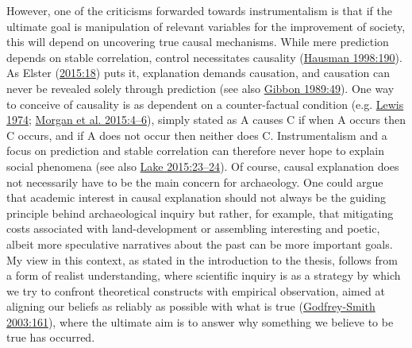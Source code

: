 \documentclass[
  a4paper,
  oneside]{uiophdthesis}
\begin{document}
However, one of the criticisms forwarded towards instrumentalism is that if the ultimate goal is manipulation of relevant variables for the improvement of society, this will depend on uncovering true causal mechanisms. While mere prediction depends on stable correlation, control necessitates causality (\protect\hyperlink{ref-hausman1998}{Hausman 1998:190}). As Elster (\protect\hyperlink{ref-elster2015}{2015:18}) puts it, explanation demands causation, and causation can never be revealed solely through prediction (see also \protect\hyperlink{ref-gibbon1989}{Gibbon 1989:49}). One way to conceive of causality is as dependent on a counter-factual condition (e.g. \protect\hyperlink{ref-lewis1974}{Lewis 1974}; \protect\hyperlink{ref-morgan2015}{Morgan et al. 2015:4--6}), simply stated as A causes C if when A occurs then C occurs, and if A does not occur then neither does C. Instrumentalism and a focus on prediction and stable correlation can therefore never hope to explain social phenomena (see also \protect\hyperlink{ref-lake2015}{Lake 2015:23--24}). Of course, causal explanation does not necessarily have to be the main concern for archaeology. One could argue that academic interest in causal explanation should not always be the guiding principle behind archaeological inquiry but rather, for example, that mitigating costs associated with land-development or assembling interesting and poetic, albeit more speculative narratives about the past can be more important goals. My view in this context, as stated in the introduction to the thesis, follows from a form of realist understanding, where scientific inquiry is as a strategy by which we try to confront theoretical constructs with empirical observation, aimed at aligning our beliefs as reliably as possible with what is true (\protect\hyperlink{ref-godfrey-smith2003}{Godfrey-Smith 2003:161}), where the ultimate aim is to answer why something we believe to be true has occurred.
\end{document}
